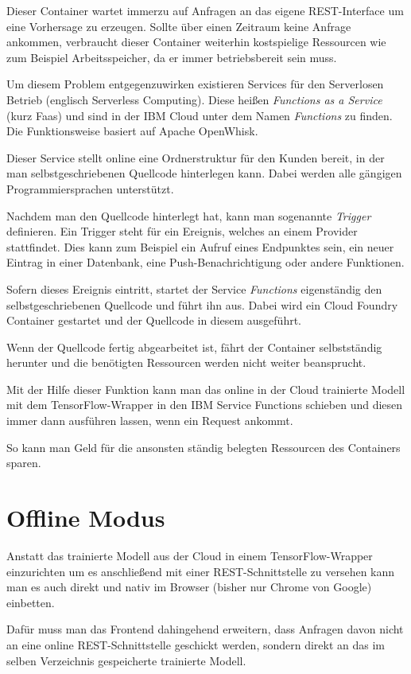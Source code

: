 Dieser Container wartet immerzu auf Anfragen an das eigene REST-Interface um eine Vorhersage zu erzeugen. Sollte über
einen Zeitraum keine Anfrage ankommen, verbraucht dieser Container weiterhin kostspielige Ressourcen wie zum Beispiel
Arbeitsspeicher, da er immer betriebsbereit sein muss.

Um diesem Problem entgegenzuwirken existieren Services für den Serverlosen Betrieb (englisch Serverless Computing).
Diese heißen \textit{Functions as a Service} (kurz Faas) und sind in der IBM Cloud unter dem Namen \textit{Functions}
zu finden. Die Funktionsweise basiert auf Apache OpenWhisk.

Dieser Service stellt online eine Ordnerstruktur für den Kunden bereit, in der man selbstgeschriebenen Quellcode
hinterlegen kann. Dabei werden alle gängigen Programmiersprachen unterstützt.

Nachdem man den Quellcode hinterlegt hat, kann man sogenannte \textit{Trigger} definieren. Ein Trigger steht für ein
Ereignis, welches an einem Provider stattfindet. Dies kann zum Beispiel ein Aufruf eines Endpunktes sein, ein neuer
Eintrag in einer Datenbank, eine Push-Benachrichtigung oder andere Funktionen.

Sofern dieses Ereignis eintritt, startet der Service \textit{Functions} eigenständig den selbstgeschriebenen Quellcode
und führt ihn aus. Dabei wird ein Cloud Foundry Container gestartet und der Quellcode in diesem ausgeführt.

Wenn der Quellcode fertig abgearbeitet ist, fährt der Container selbstständig herunter und die benötigten Ressourcen
werden nicht weiter beansprucht.

Mit der Hilfe dieser Funktion kann man das online in der Cloud trainierte Modell mit dem TensorFlow-Wrapper in den IBM
Service Functions schieben und diesen immer dann ausführen lassen, wenn ein Request ankommt.

So kann man Geld für die ansonsten ständig belegten Ressourcen des Containers sparen.

\section{Offline Modus}
Anstatt das trainierte Modell aus der Cloud in einem TensorFlow-Wrapper einzurichten um es anschließend mit einer
REST-Schnittstelle zu versehen kann man es auch direkt und nativ im Browser (bisher nur Chrome von Google) einbetten.

Dafür muss man das Frontend dahingehend erweitern, dass Anfragen davon nicht an eine online REST-Schnittstelle geschickt
werden, sondern direkt an das im selben Verzeichnis gespeicherte trainierte Modell.

